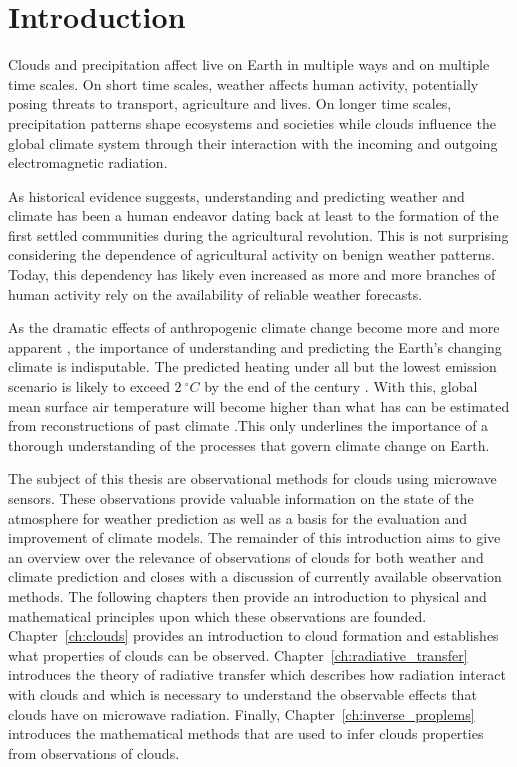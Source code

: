 
\chapter{Introduction}

Clouds and precipitation affect live on Earth in multiple ways and on multiple
time scales. On short time scales, weather affects human activity, potentially
posing threats to transport, agriculture and lives. On longer time scales,
precipitation patterns shape ecosystems and societies while clouds influence the
global climate system through their interaction with the incoming and outgoing
electromagnetic radiation.

As historical evidence suggests, understanding and predicting weather and climate
has been a human endeavor dating back at least to the formation of the first
settled communities during the agricultural revolution. This is not surprising
considering the dependence of agricultural activity on benign weather patterns.
Today, this dependency has likely even increased as more and more branches of
human activity rely on the availability of reliable weather forecasts.

As the dramatic effects of anthropogenic climate change become more and more
apparent \cite{coronese19, grinsted19}, the importance of understanding and
predicting the Earth's changing climate is indisputable. The predicted heating
under all but the lowest emission scenario is likely to exceed $2\ \unit{^\circ
  C}$ by the end of the century \cite{collins13}. With this, global mean surface
air temperature will become higher than what has can be estimated from
reconstructions of past climate \cite{delmotte13}.This only underlines the
importance of a thorough understanding of the processes that govern climate
change on Earth.

The subject of this thesis are observational methods for clouds using microwave
sensors. These observations provide valuable information on the state of the
atmosphere for weather prediction as well as a basis for the evaluation and
improvement of climate models. The remainder of this introduction aims to give
an overview over the relevance of observations of clouds for both weather and
climate prediction and closes with a discussion of currently available
observation methods. The following chapters then provide an introduction to
physical and mathematical principles upon which these observations are founded.
Chapter~\ref{ch:clouds} provides an introduction to cloud formation and
establishes what properties of clouds can be observed.
Chapter~\ref{ch:radiative_transfer} introduces the theory of radiative transfer
which describes how radiation interact with clouds and which is necessary to
understand the observable effects that clouds have on microwave radiation.
Finally, Chapter~\ref{ch:inverse_proplems} introduces the mathematical methods
that are used to infer clouds properties from observations of clouds.

